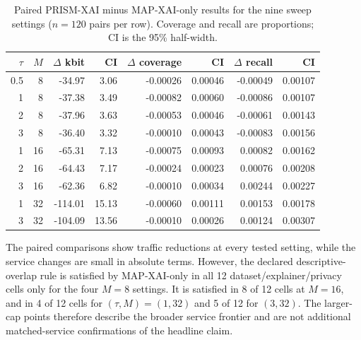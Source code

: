 \begin{table}[htbp]

\caption{Paired PRISM-XAI minus MAP-XAI-only results for the nine sweep settings ($n=120$ pairs per row). Coverage and recall are proportions; CI is the 95\% half-width.}

\label{tab:sweep-paired}

\centering\scriptsize

\begin{tabular}{rrrrrrrr}

\toprule

$\tau$ & $M$ & $\Delta$ kbit & CI & $\Delta$ coverage & CI & $\Delta$ recall & CI\\

\midrule

0.5 & 8 & -34.97 & 3.06 & -0.00026 & 0.00046 & -0.00049 & 0.00107\\

1 & 8 & -37.38 & 3.49 & -0.00082 & 0.00060 & -0.00086 & 0.00107\\

2 & 8 & -37.96 & 3.63 & -0.00053 & 0.00046 & -0.00061 & 0.00143\\

3 & 8 & -36.40 & 3.32 & -0.00010 & 0.00043 & -0.00083 & 0.00156\\

1 & 16 & -65.31 & 7.13 & -0.00075 & 0.00093 & 0.00082 & 0.00162\\

2 & 16 & -64.43 & 7.17 & -0.00024 & 0.00023 & 0.00076 & 0.00208\\

3 & 16 & -62.36 & 6.82 & -0.00010 & 0.00034 & 0.00244 & 0.00227\\

1 & 32 & -114.01 & 15.13 & -0.00060 & 0.00111 & 0.00153 & 0.00178\\

3 & 32 & -104.09 & 13.56 & -0.00010 & 0.00026 & 0.00124 & 0.00307\\

\bottomrule

\end{tabular}

\end{table}

The paired comparisons show traffic reductions at every tested setting, while the service changes are small in absolute terms. However, the declared descriptive-overlap rule is satisfied by MAP-XAI-only in all 12 dataset/explainer/privacy cells only for the four $M=8$ settings. It is satisfied in 8 of 12 cells at $M=16$, and in 4 of 12 cells for $(\tau,M)=(1,32)$ and 5 of 12 for $(3,32)$. The larger-cap points therefore describe the broader service frontier and are not additional matched-service confirmations of the headline claim.


